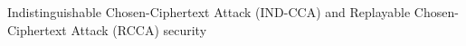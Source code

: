 \begin{frame}{Indistinguishable Chosen-Ciphertext Attack (IND-CCA) and Replayable Chosen-Ciphertext Attack (RCCA) security}
 

\end{frame}
